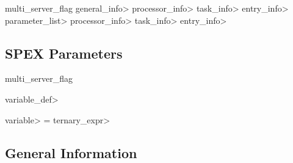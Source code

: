 
\newcommand{\altflg}[1]{#1}
\newcommand{\swapflg}{\let\tmpflg\chgflg\let\chgflg\altflg\let\altflg\tmpflg}

\begin{bnf}{multi\_server\_flag}
   \<general\_info> \<processor\_info>  
  \<task\_info> \<entry\_info> 
  \oritem \<parameter\_list> \<processor\_info>  
  \<task\_info> \<entry\_info>   
\end{bnf}

\subsection{SPEX Parameters}
\label{sec:spex-parameters}

\begin{bnf}{multi\_server\_flag}
    

   \<variable\_def>

   \<variable> = \<ternary\_expr>

\end{bnf}

\subsection{General Information}
\label{sec:general-in}

